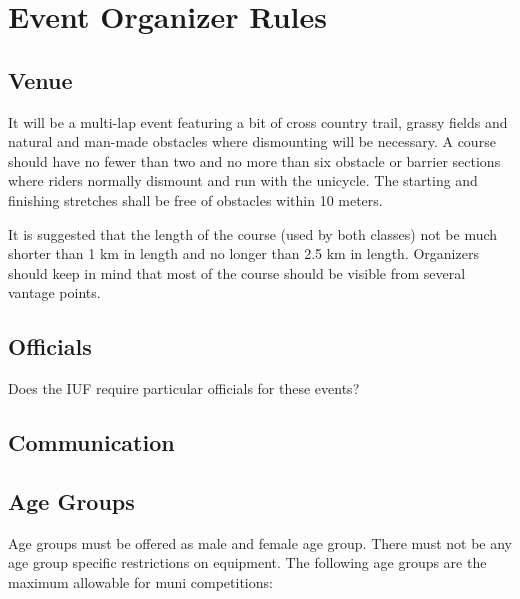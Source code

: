 \chapter{Event Organizer Rules}

\section{Venue}

It will be a multi-lap event featuring a bit of cross country trail, grassy fields and natural and man-made obstacles where dismounting will be necessary.
A course should have no fewer than two and no more than six obstacle or barrier sections where riders normally dismount and run with the unicycle.
The starting and finishing stretches shall be free of obstacles within 10 meters.

It is suggested that the length of the course (used by both classes) not be much shorter than 1 km in length and no longer than 2.5 km in length. 
Organizers should keep in mind that most of the course should be visible from several vantage points.

\section{Officials}

\begin{framed}
Does the IUF require particular officials for these events?
\end{framed}

\section{Communication}

\begin{framed}
Some thoughts on what might need to be communicated:
\begin{itemize}
\item age groups
\item results
\end{itemize}
}
\end{framed}

\section{Age Groups}

Age groups must be offered as male and female age group.
There must not be any age group specific restrictions on equipment.
The following age groups are the maximum allowable for muni competitions:

